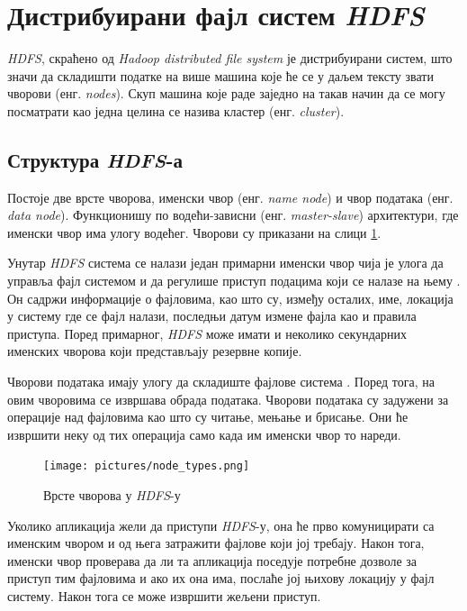 \documentclass[12pt,oneside]{memoir}
\begin{document}
\section{Дистрибуирани фајл систем \textit{HDFS}}
\label{sec:hdfs}

\textit{HDFS}, скраћено од \textit{Hadoop distributed file system} је дистрибуирани систем, што значи да складишти податке на више машина које ће се у даљем тексту звати чворови (енг. \textit{nodes}). Скуп машина које раде заједно на такав начин да се могу посматрати као једна целина се назива кластер (енг. \textit{cluster}). 

\subsection{Структура \textit{HDFS}-а}
\label{subsec:hdfs_nodes}

Постоје две врсте чворова, именски чвор (енг. \textit{name node}) и чвор података (енг. \textit{data node}). Функционишу по водећи-зависни (енг. \textit{master-slave}) архитектури, где именски чвор има улогу водећег. Чворови су приказани на слици \ref{fig:hadoop_nodovi}.

Унутар \textit{HDFS} система се налази један примарни именски чвор чија је улога да управља фајл системом и да регулише приступ подацима који се налазе на њему \cite{hadoop_arch_guide}. Он садржи информације о фајловима, као што су, између осталих, име, локација у систему где се фајл налази, последњи датум измене фајла као и правила приступа. Поред примарног, \textit{HDFS} може имати и неколико секундарних именских чворова који представљају резервне копије.

Чворови података имају улогу да складиште фајлове система \cite{hadoop_arch_guide}. Поред тога, на овим чворовима се извршава обрада података. Чворови података су задужени за операције над фајловима као што су читање, мењање и брисање. Они ће извршити неку од тих операција само када им именски чвор то нареди.

\begin{figure}[!ht]
  \centering
  \texttt{[image: pictures/node\_types.png]}
  \caption{Врсте чворова у \textit{HDFS}-у}
  \label{fig:hadoop_nodovi}
\end{figure}

Уколико апликација жели да приступи \textit{HDFS}-у, она ће прво комуницирати са именским чвором и од њега затражити фајлове који јој требају. Након тога, именски чвор проверава да ли та апликација поседује потребне дозволе за приступ тим фајловима и ако их она има, послаће јој њихову локацију у фајл систему. Након тога се може извршити жељени приступ. 
\end{document}
